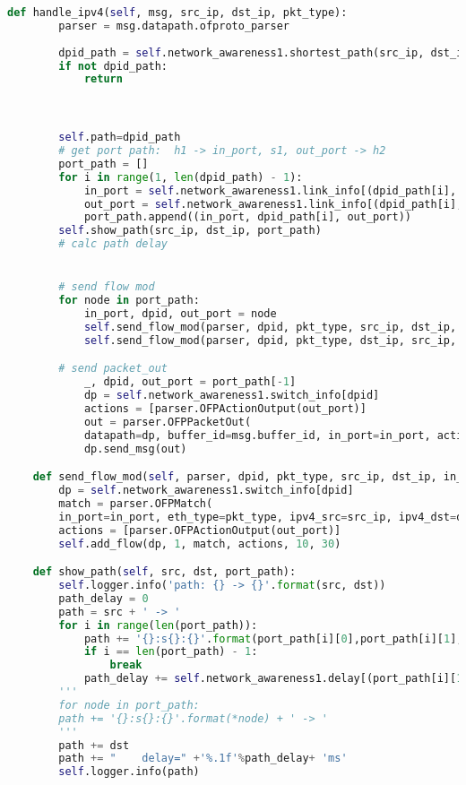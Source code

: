 \documentclass{xjtureport}
\begin{document}
\begin{lstlisting}[language=python]
	def handle_ipv4(self, msg, src_ip, dst_ip, pkt_type):
		parser = msg.datapath.ofproto_parser
		
		dpid_path = self.network_awareness1.shortest_path(src_ip, dst_ip,weight=self.weight)
		if not dpid_path:
			return



		self.path=dpid_path
		# get port path:  h1 -> in_port, s1, out_port -> h2
		port_path = []
		for i in range(1, len(dpid_path) - 1):
			in_port = self.network_awareness1.link_info[(dpid_path[i], dpid_path[i - 1])]
			out_port = self.network_awareness1.link_info[(dpid_path[i], dpid_path[i + 1])]
			port_path.append((in_port, dpid_path[i], out_port))
		self.show_path(src_ip, dst_ip, port_path)
		# calc path delay


		# send flow mod
		for node in port_path:
			in_port, dpid, out_port = node
			self.send_flow_mod(parser, dpid, pkt_type, src_ip, dst_ip, in_port, out_port)
			self.send_flow_mod(parser, dpid, pkt_type, dst_ip, src_ip, out_port, in_port)

		# send packet_out
			_, dpid, out_port = port_path[-1]
			dp = self.network_awareness1.switch_info[dpid]
			actions = [parser.OFPActionOutput(out_port)]
			out = parser.OFPPacketOut(
			datapath=dp, buffer_id=msg.buffer_id, in_port=in_port, actions=actions, data=msg.data)
			dp.send_msg(out)

	def send_flow_mod(self, parser, dpid, pkt_type, src_ip, dst_ip, in_port, out_port):
		dp = self.network_awareness1.switch_info[dpid]
		match = parser.OFPMatch(
		in_port=in_port, eth_type=pkt_type, ipv4_src=src_ip, ipv4_dst=dst_ip)
		actions = [parser.OFPActionOutput(out_port)]
		self.add_flow(dp, 1, match, actions, 10, 30)

	def show_path(self, src, dst, port_path):
		self.logger.info('path: {} -> {}'.format(src, dst))
		path_delay = 0
		path = src + ' -> '
		for i in range(len(port_path)):
			path += '{}:s{}:{}'.format(port_path[i][0],port_path[i][1],port_path[i][2]) + ' -> '
			if i == len(port_path) - 1:
				break
			path_delay += self.network_awareness1.delay[(port_path[i][1],port_path[i+1][1])]
		'''
		for node in port_path:
		path += '{}:s{}:{}'.format(*node) + ' -> '
		'''
		path += dst
		path += "    delay=" +'%.1f'%path_delay+ 'ms'
		self.logger.info(path)
\end{lstlisting}
\end{document}
